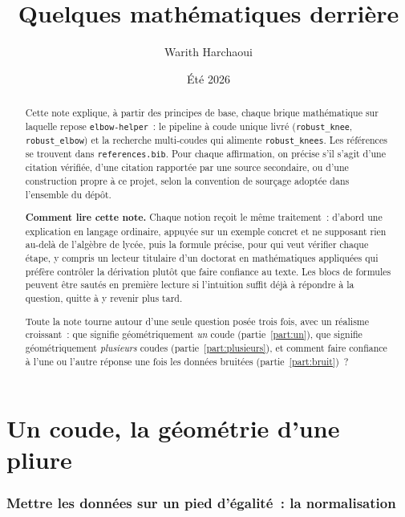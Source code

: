 \documentclass[11pt]{article}
\title{Quelques mathématiques derrière \code{elbow-helper}}
\author{Warith Harchaoui}
\date{Été 2026}
\newcommand{\code}[1]{\texttt{#1}}
\begin{document}
\maketitle

\begin{abstract}
Cette note explique, à partir des principes de base, chaque brique
mathématique sur laquelle repose \code{elbow-helper}~: le pipeline à coude
unique livré (\code{robust\_knee}, \code{robust\_elbow}) et la recherche
multi-coudes qui alimente \code{robust\_knees}. Les références se trouvent
dans \code{references.bib}. Pour chaque affirmation, on précise s'il s'agit
d'une citation vérifiée, d'une citation rapportée par une source secondaire,
ou d'une construction propre à ce projet, selon la convention de sourçage
adoptée dans l'ensemble du dépôt.

\textbf{Comment lire cette note.} Chaque notion reçoit le même traitement~:
d'abord une explication en langage ordinaire, appuyée sur un exemple
concret et ne supposant rien au-delà de l'algèbre de lycée, puis la formule
précise, pour qui veut vérifier chaque étape, y compris un lecteur
titulaire d'un doctorat en mathématiques appliquées qui préfère contrôler
la dérivation plutôt que faire confiance au texte. Les blocs de formules
peuvent être sautés en première lecture si l'intuition suffit déjà à
répondre à la question, quitte à y revenir plus tard.

Toute la note tourne autour d'une seule question posée trois fois, avec un
réalisme croissant~: que signifie géométriquement \emph{un} coude
(partie~\ref{part:un}), que signifie géométriquement \emph{plusieurs}
coudes (partie~\ref{part:plusieurs}), et comment faire confiance à l'une ou
l'autre réponse une fois les données bruitées (partie~\ref{part:bruit})~?
\end{abstract}

\clearpage

\tableofcontents

\clearpage

\part{Un coude, la géométrie d'une pliure}
\label{part:un}

\section{Mettre les données sur un pied d'égalité~: la normalisation}
\end{document}

